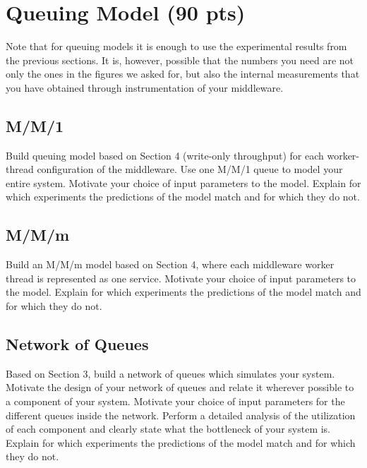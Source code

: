 \documentclass[11pt,a4paper]{article}
\begin{document}
\section{Queuing Model (90 pts)}

Note that for queuing models it is enough to use the experimental results from the previous sections. It is, however, possible that the numbers you need are not only the ones in the figures we asked for, but also the internal measurements that you have obtained through instrumentation of your middleware.

\subsection{M/M/1}

Build queuing model based on Section 4 (write-only throughput) for each worker-thread configuration of the middleware. Use one M/M/1 queue to model your entire system. Motivate your choice of input parameters to the model. Explain for which experiments the predictions of the model match and for which they do not.

\subsection{M/M/m}

Build an M/M/m model based on Section 4, where each middleware worker thread is represented as one service.  Motivate your choice of input parameters to the model. Explain for which experiments the predictions of the model match and for which they do not.

\subsection{Network of Queues}

Based on Section 3, build a network of queues which simulates your system. Motivate the design of your network of queues and relate it wherever possible to a component of your system. Motivate your choice of input parameters for the different queues inside the network. Perform a detailed analysis of the utilization of each component and clearly state what the bottleneck of your system is. Explain for which experiments the predictions of the model match and for which they do not.
\end{document}
